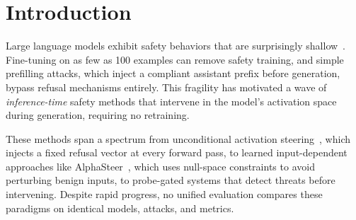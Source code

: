 \documentclass{article}
\begin{document}
\begin{abstract}
prefilling, AlphaSteer catches semantic attacks) is the corollary's prescribed architecture. Adaptive robustness is asymmetric: \textbf{on Llama the probe catches 80\% of canonical prefilling attacks but only 65\% of probe-aware adversarial variants, with residual ASR 30\%; Mistral's prefilling-specific probe does not fire on adaptive variants}. Qwen-2.5 at either tested layer is an unexplained counterexample to the layer-depth split. Paper-shipped probe weights on Mistral and Llama drift outside $\pm 2$pp under current library versions; fresh retraining recovers paper numbers for both; retraining script released. The response probe operates in a subspace \emph{orthogonal} to the refusal steering vector ($|\cos|<0.04$ on 6/7 models), detecting information activation steering cannot access. MMLU fails to capture steering's utility cost (manifests as behavioral hedging, not factual loss); probe training on narrow distributions causes 80--100\% FPR that diverse negative sets eliminate. Code, attacks, per-sample results, and LLM-judge prompt released; we collate eight diagnostic protocols for activation-level safety method evaluation (App.~\ref{app:diagnostic_protocols}).
\end{abstract}

\section{Introduction}
\label{sec:intro}

Large language models exhibit safety behaviors that are surprisingly shallow~\citep{qi2026safety}. Fine-tuning on as few as 100 examples can remove safety training, and simple prefilling attacks, which inject a compliant assistant prefix before generation, bypass refusal mechanisms entirely. This fragility has motivated a wave of \emph{inference-time} safety methods that intervene in the model's activation space during generation, requiring no retraining.

These methods span a spectrum from unconditional activation steering~\citep{turner2023activation}, which injects a fixed refusal vector at every forward pass, to learned input-dependent approaches like AlphaSteer~\citep{alphasteer2026}, which uses null-space constraints to avoid perturbing benign inputs, to probe-gated systems that detect threats before intervening. Despite rapid progress, no unified evaluation compares these paradigms on identical models, attacks, and metrics.
\end{document}
